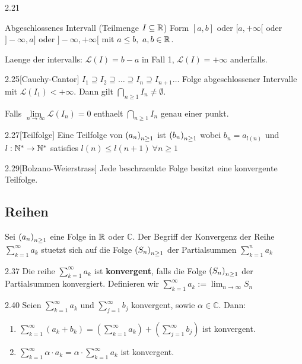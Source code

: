\begin{definition}{2.21}
    \par Abgeschlossenes Intervall (Teilmenge $I \subseteq \mathbb{R}$)
    Form $[a,b]$ oder $[a, +\infty[$ oder $]-\infty, a]$ oder $]-\infty, +\infty[$ mit $a \le b,\ a,b \in \mathbb{R}$.

    Laenge der intervalls: $\mathcal{L}(I) = b - a$ in Fall 1, $\mathcal{L}(I) = +\infty$ anderfalls.
\end{definition}

\begin{satz}{2.25}[Cauchy-Cantor]
    \label{satz:cauchy-cantor}
    $I_1 \supseteq I_2 \supseteq \dots \supseteq I_n \supseteq I_{n + 1} \dots$ Folge abgeschlossener Intervalle mit $\mathcal{L}(I_1) < +\infty$.
    Dann gilt $\bigcap_{n \ge 1} I_n \ne \emptyset$.

    Falls $\underset{n \to \infty}{\lim} \mathcal{L}(I_n) = 0$ enthaelt $\bigcap_{n \ge 1} I_n$ genau einer punkt.
\end{satz}

\begin{definition}{2.27}[Teilfolge]
    Eine Teilfolge von $\left( a_n \right)_{n \ge 1}$ ist $\left( b_n \right)_{n \ge 1}$ wobei $b_n = a_{l(n)}$ und $l: \mathbb{N}^* \to \mathbb{N}^*$ satisfies $l(n) \le l(n + 1)\ \forall n \ge 1$
\end{definition}

\begin{satz}{2.29}[Bolzano-Weierstrass]
    \label{satz:bolzano-weierstrass}
    Jede beschraenkte Folge besitzt eine konvergente Teilfolge.
\end{satz}

\subsection{Reihen}
Sei $\left( a_n \right)_{n \ge 1}$ eine Folge in $\mathbb{R}$ oder $\mathbb{C}$. Der Begriff der Konvergenz der Reihe $\sum_{k = 1}^{\infty} a_k$ stuetzt sich auf die
Folge $\left( S_n \right)_{n \ge 1}$ der Partialsummen $\sum_{k = 1}^n a_k$

\begin{definition}{2.37}
    Die reihe $\sum_{k = 1}^{\infty} a_k$ ist \textbf{konvergent}, falls die Folge $\left( S_n \right)_{n \ge 1}$ der Partialsummen konvergiert.
    Definieren wir $\sum_{k = 1}^{\infty} a_k := \lim_{n \to \infty} S_n$
\end{definition}

\begin{satz}{2.40}
    Seien $\sum_{k=1}^{\infty} a_k$ und $\sum_{j=1}^{\infty} b_j$ konvergent, sowie $\alpha \in \mathbb{C}$.
    Dann:
    \begin{enumerate}
        \item $\sum_{k=1}^{\infty} (a_k + b_k) = \left( \sum_{k=1}^{\infty} a_k \right) + \left( \sum_{j=1}^{\infty} b_j \right)$ ist konvergent.
        \item $\sum_{k=1}^{\infty} \alpha \cdot a_k = \alpha \cdot \sum_{k=1}^{\infty} a_k$ ist konvergent.
    \end{enumerate}
\end{satz}

